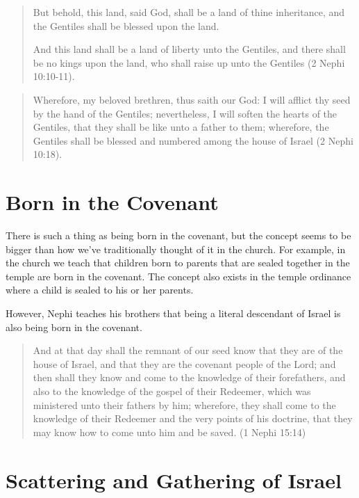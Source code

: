 \begin{quotation}
But behold, this land, said God, shall be a land of thine inheritance, and the Gentiles shall be blessed upon the land.

And this land shall be a land of liberty unto the Gentiles, and there shall be no kings upon the land, who shall raise up unto the Gentiles (2 Nephi 10:10-11).
\end{quotation}

\begin{quotation}
Wherefore, my beloved brethren, thus saith our God: I will afflict thy seed by the hand of the Gentiles; nevertheless, I will soften the hearts of the Gentiles, that they shall be like unto a father to them; wherefore, the Gentiles shall be blessed and numbered among the house of Israel (2 Nephi 10:18).
\end{quotation}


\section{Born in the Covenant}

There is such a thing as being born in the covenant, but the concept seems to be bigger than how we've traditionally thought of it in the church. For example, in the church we teach that children born to parents that are sealed together in the temple are born in the covenant. The concept also exists in the temple ordinance where a child is sealed to his or her parents.

However, Nephi teaches his brothers that being a literal descendant of Israel is also being born in the covenant. 

\begin{quotation}
And at that day shall the remnant of our seed know that they are of the house of Israel, and that they are the covenant people of the Lord; and then shall they know and come to the knowledge of their forefathers, and also to the knowledge of the gospel of their Redeemer, which was ministered unto their fathers by him; wherefore, they shall come to the knowledge of their Redeemer and the very points of his doctrine, that they may know how to come unto him and be saved. (1 Nephi 15:14)
\end{quotation}

\section{Scattering and Gathering of Israel}

